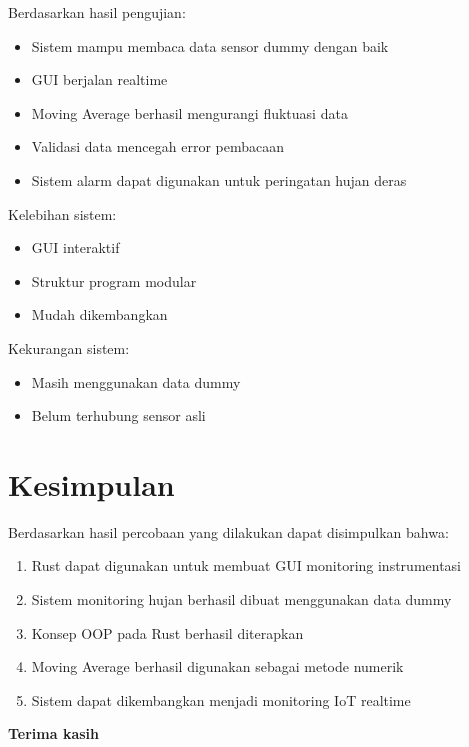 \documentclass[a4paper,12pt]{article}
\begin{document}
Berdasarkan hasil pengujian:
\begin{itemize}
    \item Sistem mampu membaca data sensor dummy dengan baik
    \item GUI berjalan realtime
    \item Moving Average berhasil mengurangi fluktuasi data
    \item Validasi data mencegah error pembacaan
    \item Sistem alarm dapat digunakan untuk peringatan hujan deras
\end{itemize}

Kelebihan sistem:
\begin{itemize}
    \item GUI interaktif
    \item Struktur program modular
    \item Mudah dikembangkan
\end{itemize}

Kekurangan sistem:
\begin{itemize}
    \item Masih menggunakan data dummy
    \item Belum terhubung sensor asli
\end{itemize}

\section{Kesimpulan}

Berdasarkan hasil percobaan yang dilakukan dapat disimpulkan bahwa:
\begin{enumerate}
    \item Rust dapat digunakan untuk membuat GUI monitoring instrumentasi
    \item Sistem monitoring hujan berhasil dibuat menggunakan data dummy
    \item Konsep OOP pada Rust berhasil diterapkan
    \item Moving Average berhasil digunakan sebagai metode numerik
    \item Sistem dapat dikembangkan menjadi monitoring IoT realtime
\end{enumerate}

\vspace{2cm}

\begin{center}
\textbf{Terima kasih}
\end{center}
\end{document}

